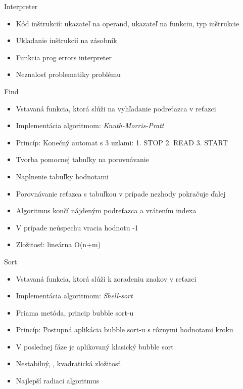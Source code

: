 \documentclass[pdf,slideColor,fyma]{prosper}
\begin{document}
\begin{slide}{Interpreter}
\begin{itemize}
\item Kód inštrukcií: ukazateľ na operand, ukazateľ na funkciu, typ inštrukcie
\item Ukladanie inštrukcií na zásobník
\item Funkcia prog errors interpreter
\item Neznalosť problematiky problému

\end{itemize}

\end{slide}

\begin{slide}{Find}
\begin{itemize}
\item Vstavaná funkcia, ktorá slúži na vyhľadanie podreťazca v reťazci
\item Implementácia algoritmom: \emph{Knuth-Morris-Pratt}
\item Princíp: Konečný automat s 3 uzlami: 1. STOP 2. READ 3. START
\item Tvorba pomocnej tabuľky na porovnávanie
\item Naplnenie tabuľky hodnotami
\item Porovnávanie reťazca s tabuľkou v prípade nezhody pokračuje ďalej
\item Algoritmus končí nájdeným podreťazca a vrátením indexa
\item V prípade neúspechu vracia hodnotu -1
\item Zložitosť: lineárna O(n+m)
\end{itemize}

\end{slide}


\begin{slide}{Sort}
\begin{itemize}
\item Vstavaná funkcia, ktorá slúži k zoradeniu znakov v reťazci
\item Implementácia algoritmom: \emph{Shell-sort}
\item Priama metóda, princip bubble sort-u
\item Princíp: Postupná aplikácia bubble sort-u s rôznymi hodnotami kroku
\item V poslednej fáze je aplikovaný klasický bubble sort
\item Nestabilný,  , kvadratická zložitosť
\item Najlepší radiaci algoritmus



\end{itemize}

\end{slide}
\end{document}
